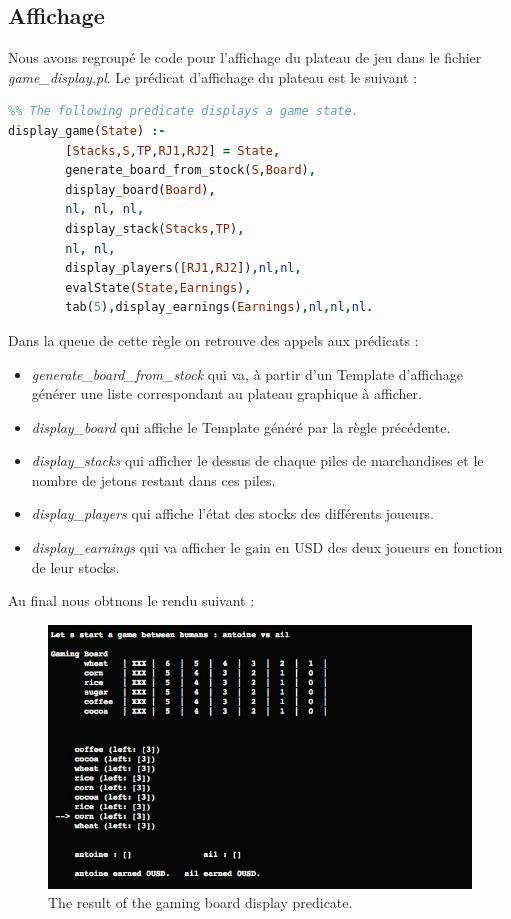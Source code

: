 \documentclass[a4paper, 11pt,twoside, leqno]{report}
\theoremstyle{plain}
\begin{document}
\subsection{Affichage}
Nous avons regroupé le code pour l'affichage du plateau de jeu dans le fichier \textit{game\_{}display.pl}. Le prédicat d'affichage du plateau est le suivant : 
\begin{lstlisting}[language=prolog]
%%%% display_game(+Game_State_To_Be_Displayed)
%% The following predicate displays a game state.
display_game(State) :-
		[Stacks,S,TP,RJ1,RJ2] = State,
		generate_board_from_stock(S,Board),
		display_board(Board),
		nl, nl, nl,
		display_stack(Stacks,TP),
		nl, nl,
		display_players([RJ1,RJ2]),nl,nl,
		evalState(State,Earnings),
		tab(5),display_earnings(Earnings),nl,nl,nl.
\end{lstlisting}

Dans la queue de cette règle on retrouve des appels aux prédicats :
\begin{itemize}
    \item \textit{generate\_{}board\_{}from\_{}stock} qui va, à partir d'un Template d'affichage générer une liste correspondant au plateau graphique à afficher.  
    \item \textit{display\_{}board} qui affiche le Template généré par la règle précédente.
    \item \textit{display\_{}stacks} qui afficher le dessus de chaque piles de marchandises et le nombre de jetons restant dans ces piles.
    \item \textit{display\_{}players} qui affiche l'état des stocks des différents joueurs.
    \item \textit{display\_{}earnings} qui va afficher le gain en USD des deux joueurs en fonction de leur stocks.
\end{itemize}
Au final nous obtnons le rendu suivant : 
\begin{figure}[H]
    \begin{center}
        \includegraphics[scale=0.5]{ScreenGamingBoard.jpg}
     \end{center}
     \caption{The result of the gaming board display predicate.}
     \label{fig:gamingboard}
 \end{figure}
     
\end{document}

